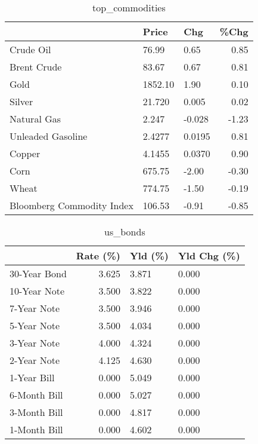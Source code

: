 \documentclass{article}%
\begin{document}
\begin{table}[htbp]%
\caption{top\_commodities}%
\centering%
\begin{adjustbox}{width=1\textwidth}%
\begin{tabular}{lllr}
\toprule
                          &   Price &    Chg &  \%Chg \\
\midrule
               Crude Oil  &   76.99 &   0.65 &  0.85 \\
             Brent Crude  &   83.67 &   0.67 &  0.81 \\
                    Gold  & 1852.10 &   1.90 &  0.10 \\
                  Silver  &  21.720 &  0.005 &  0.02 \\
             Natural Gas  &   2.247 & -0.028 & -1.23 \\
       Unleaded Gasoline  &  2.4277 & 0.0195 &  0.81 \\
                  Copper  &  4.1455 & 0.0370 &  0.90 \\
                    Corn  &  675.75 &  -2.00 & -0.30 \\
                   Wheat  &  774.75 &  -1.50 & -0.19 \\
Bloomberg Commodity Index &  106.53 &  -0.91 & -0.85 \\
\bottomrule
\end{tabular}
%
\end{adjustbox}%
\end{table}

%


\begin{table}[htbp]%
\caption{us\_bonds}%
\centering%
\begin{adjustbox}{width=1\textwidth}%
\begin{tabular}{lrll}
\toprule
             &  Rate (\%) & Yld (\%) & Yld Chg (\%) \\
\midrule
30-Year Bond &     3.625 &   3.871 &       0.000 \\
10-Year Note &     3.500 &   3.822 &       0.000 \\
 7-Year Note &     3.500 &   3.946 &       0.000 \\
 5-Year Note &     3.500 &   4.034 &       0.000 \\
 3-Year Note &     4.000 &   4.324 &       0.000 \\
 2-Year Note &     4.125 &   4.630 &       0.000 \\
 1-Year Bill &     0.000 &   5.049 &       0.000 \\
6-Month Bill &     0.000 &   5.027 &       0.000 \\
3-Month Bill &     0.000 &   4.817 &       0.000 \\
1-Month Bill &     0.000 &   4.602 &       0.000 \\
\bottomrule
\end{tabular}
%
\end{adjustbox}%
\end{table}
\end{document}
